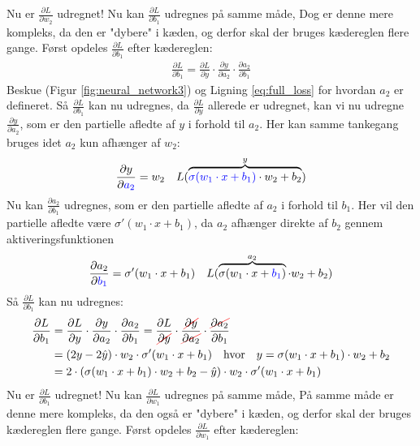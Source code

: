 \documentclass{article}
\newcommand{\figureref}[1]{(Figur \ref{#1})}
\newcommand\Ccancel[2][black]{
    \let\OldcancelColor\CancelColor
    \renewcommand\CancelColor{\color{#1}}
    \cancel{#2}
    \renewcommand\CancelColor{\OldcancelColor}
}
\begin{document}
Nu er $\frac{\partial L}{\partial w_2}$ udregnet! Nu kan $\frac{\partial L}{\partial b_1}$ udregnes på samme måde, Dog er denne mere kompleks, da den er "dybere" i kæden, og derfor skal der bruges kædereglen flere gange. Først opdeles $\frac{\partial L}{\partial b_1}$ efter kædereglen:
\begin{align}
  \frac{\partial L}{\partial b_1} = \frac{\partial L}{\partial y} \cdot \frac{\partial y}{\partial a_2} \cdot \frac{\partial a_2}{\partial b_1}
\end{align}
Beskue \figureref{fig:neural_network3} og Ligning \eqref{eq:full_loss} for hvordan $a_2$ er defineret. Så $\frac{\partial L}{\partial b_1}$ kan nu udregnes, da $\frac{\partial L}{\partial y}$ allerede er udregnet, kan vi nu udregne $\frac{\partial y}{\partial a_2}$, som er den partielle afledte af $y$ i forhold til $a_2$. Her kan samme tankegang bruges idet $a_2$ kun afhænger af $w_2$:
\begin{align}
  \frac{\partial y}{\partial {\color{blue}a_2}} = w_2 && L(\overbrace{{\color{blue}\sigma(w_1 \cdot x + b_1)} \cdot w_2 + b_2}^{y} )
\end{align}
Nu kan $\frac{\partial a_2}{\partial b_1}$ udregnes, som er den partielle afledte af $a_2$ i forhold til $b_1$. Her vil den partielle afledte være $\sigma'(w_1 \cdot x + b_1)$, da $a_2$ afhænger direkte af $b_2$ gennem aktiveringsfunktionen
\begin{align}
  \frac{\partial a_2}{\partial {\color{blue}b_1}} = \sigma'(w_1 \cdot x + b_1) && L(\overbrace{\sigma(w_1 \cdot x + {\color{blue}b_1})}^{a_2} \cdot w_2 + b_2)
\end{align}
Så $\frac{\partial L}{\partial b_1}$ kan nu udregnes:
\begin{align}
  \frac{\partial L}{\partial b_1} &= \frac{\partial L}{\partial y} \cdot \frac{\partial y}{\partial a_2} \cdot \frac{\partial a_2}{\partial b_1} = \frac{\partial L}{\Ccancel[red]{\partial y}} \cdot \frac{\Ccancel[red]{\partial y}}{\Ccancel[red]{\partial a_2}} \cdot \frac{\Ccancel[red]{\partial a_2}}{\partial b_1}\\
  &= (2y - 2\hat{y}) \cdot w_2 \cdot \sigma'(w_1 \cdot x + b_1) \quad\text{hvor}\quad y = \sigma(w_1 \cdot x + b_1) \cdot w_2 + b_2\\
  &= 2\cdot(\sigma(w_1 \cdot x + b_1) \cdot w_2 + b_2 - \hat{y}) \cdot w_2 \cdot \sigma'(w_1 \cdot x + b_1)
\end{align}
Nu er $\frac{\partial L}{\partial b_1}$ udregnet! Nu kan $\frac{\partial L}{\partial w_1}$ udregnes på samme måde, På samme måde er denne mere kompleks, da den også er "dybere" i kæden, og derfor skal der bruges kædereglen flere gange. Først opdeles $\frac{\partial L}{\partial w_1}$ efter kædereglen:
\end{document}

